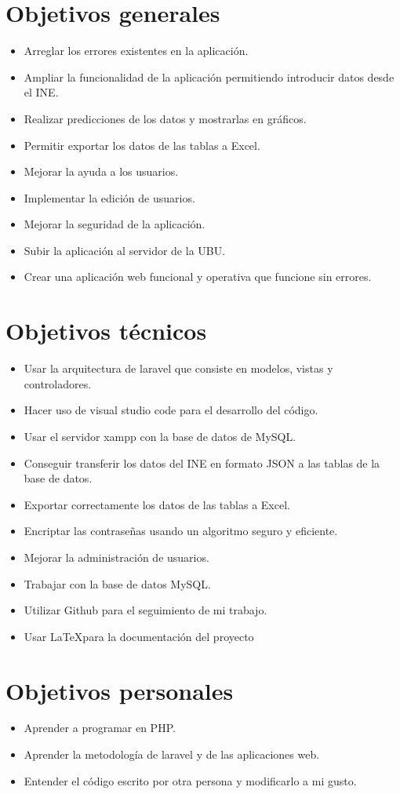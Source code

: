 \section{Objetivos generales}
\begin{itemize}
	\item Arreglar los errores existentes en la aplicación. 
	\item Ampliar la funcionalidad de la aplicación permitiendo introducir datos desde el INE.
	\item Realizar predicciones de los datos y mostrarlas en gráficos.
	\item Permitir exportar los datos de las tablas a Excel.
	\item Mejorar la ayuda a los usuarios.
	\item Implementar la edición de usuarios.
	\item Mejorar la seguridad de la aplicación.
	\item Subir la aplicación al servidor de la UBU.
	\item Crear una aplicación web funcional y operativa que funcione sin errores.
\end{itemize}
\section{Objetivos técnicos}
\begin{itemize}
	\item Usar la arquitectura de laravel que consiste en modelos, vistas y controladores.
	\item Hacer uso de visual studio code para el desarrollo del código.
	\item Usar el servidor xampp con la base de datos de MySQL.
	\item Conseguir transferir los datos del INE en formato JSON a las tablas de la base de datos.
	\item Exportar correctamente los datos de las tablas a Excel.
	\item Encriptar las contraseñas usando un algoritmo seguro y eficiente.
	\item Mejorar la administración de usuarios.
	\item Trabajar con la base de datos MySQL.
	\item Utilizar Github para el seguimiento de mi trabajo.
	\item Usar \LaTeX para la documentación del proyecto
\end{itemize}
\section{Objetivos personales}
\begin{itemize}
	\item Aprender a programar en PHP.
	\item Aprender la metodología de laravel y de las aplicaciones web.
	\item Entender el código escrito por otra persona y modificarlo a mi gusto.
\end{itemize}